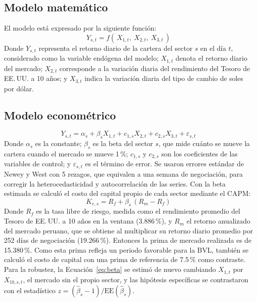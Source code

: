\documentclass[12pt]{article}
\begin{document}
\subsection{Modelo matemático}
El modelo está expresado por la siguiente función:
\[
Y_{s,t} = f(\, X_{1,t},\ X_{2,t},\ X_{3,t} \,)
\]
\noindent Donde $Y_{s,t}$ representa el retorno diario de la cartera del sector $s$ en el día $t$, considerado como la variable endógena del modelo; $X_{1,t}$ denota el retorno diario del mercado; $X_{2,t}$ corresponde a la variación diaria del rendimiento del Tesoro de EE.\,UU. a 10 años; y $X_{3,t}$ indica la variación diaria del tipo de cambio de soles por dólar.

\subsection{Modelo econométrico}
\begin{equation}
Y_{s,t} = \alpha_s + \beta_s X_{1,t} + c_{1,s} X_{2,t} + c_{2,s} X_{3,t} + \varepsilon_{s,t}
\label{eq:beta}
\end{equation}
\noindent Donde $\alpha_s$ es la constante; $\beta_s$ es la beta del sector $s$, que mide cuánto se mueve la cartera cuando el mercado se mueve 1\,\%; $c_{1,s}$ y $c_{2,s}$ son los coeficientes de las variables de control; y $\varepsilon_{s,t}$ es el término de error. Se usaron errores estándar de Newey y West con 5 rezagos, que equivalen a una semana de negociación, para corregir la heterocedasticidad y autocorrelación de las series. Con la beta estimada se calculó el costo del capital propio de cada sector mediante el CAPM:
\begin{equation}
K_{e,s} = R_f + \beta_s \,(R_m - R_f)
\label{eq:capm}
\end{equation}
\noindent Donde $R_f$ es la tasa libre de riesgo, medida como el rendimiento promedio del Tesoro de EE.\,UU. a 10 años en la ventana (3.886\,\%), y $R_m$ el retorno anualizado del mercado peruano, que se obtiene al multiplicar su retorno diario promedio por 252 días de negociación (19.266\,\%). Entonces la prima de mercado realizada es de 15.380\,\%. Como esta prima refleja un periodo favorable para la BVL, también se calculó el costo de capital con una prima de referencia de 7.5\,\% como contraste. Para la robustez, la Ecuación~\ref{eq:beta} se estimó de nuevo cambiando $X_{1,t}$ por $X_{1b,s,t}$, el mercado sin el propio sector, y las hipótesis específicas se contrastaron con el estadístico $z = (\hat{\beta}_s - 1)/\mathrm{EE}(\hat{\beta}_s)$.
\end{document}
